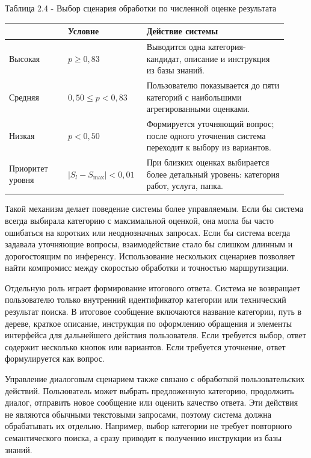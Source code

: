 \documentclass[14pt,a4paper]{extarticle}
\renewcommand{\textbf}[1]{#1}
\newcommand{\TableHead}[1]{{\centering\arraybackslash\bfseries #1\par}}
\numberwithin{figure}{section}
\numberwithin{table}{section}
\begin{document}
\textbf{Таблица 2.4 - Выбор сценария обработки по численной оценке результата}

\begin{longtable}[]{@{}|>{\centering\arraybackslash}p{0.20\linewidth}|>{\centering\arraybackslash}p{0.24\linewidth}|>{\raggedright\arraybackslash}p{0.48\linewidth}|@{}}
\hline
\TableHead{Оценка результата} & \TableHead{Условие} & \TableHead{Действие системы} \\ \hline
\endhead
Высокая & \(p \ge 0{,}83\) & Выводится одна категория-кандидат, описание и инструкция из базы знаний. \\ \hline
Средняя & \(0{,}50 \le p < 0{,}83\) & Пользователю показывается до пяти категорий с наибольшими агрегированными оценками. \\ \hline
Низкая & \(p < 0{,}50\) & Формируется уточняющий вопрос; после одного уточнения система переходит к выбору из вариантов. \\ \hline
Приоритет уровня & \(|S_l-S_{\max}|<0{,}01\) & При близких оценках выбирается более детальный уровень: категория работ, услуга, папка. \\ \hline
\end{longtable}

Такой механизм делает поведение системы более управляемым. Если бы
система всегда выбирала категорию с максимальной оценкой, она могла бы
часто ошибаться на коротких или неоднозначных запросах. Если бы система
всегда задавала уточняющие вопросы, взаимодействие стало бы слишком
длинным и дорогостоящим по инференсу. Использование нескольких сценариев
позволяет найти компромисс между скоростью обработки и точностью
маршрутизации.

Отдельную роль играет формирование итогового ответа. Система не
возвращает пользователю только внутренний идентификатор категории или
технический результат поиска. В итоговое сообщение включаются название
категории, путь в дереве, краткое описание, инструкция по оформлению
обращения и элементы интерфейса для дальнейшего действия пользователя.
Если требуется выбор, ответ содержит несколько кнопок или вариантов.
Если требуется уточнение, ответ формулируется как вопрос.

Управление диалоговым сценарием также связано с обработкой
пользовательских действий. Пользователь может выбрать предложенную
категорию, продолжить диалог, отправить новое сообщение или оценить
качество ответа. Эти действия не являются обычными текстовыми запросами,
поэтому система должна обрабатывать их отдельно. Например, выбор
категории не требует повторного семантического поиска, а сразу приводит
к получению инструкции из базы знаний.
\end{document}
